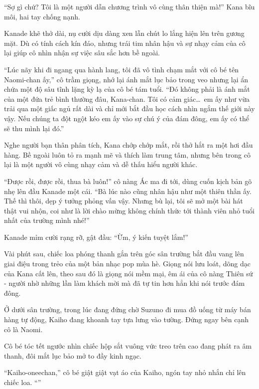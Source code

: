 \documentclass[../main.tex]{subfiles}
\begin{document}
``Sợ gì chứ? Tôi là một người dẫn chương trình vô cùng thân thiện mà!'' Kana bĩu môi, hai tay chống nạnh.

Kanade khẽ thở dài, nụ cười dịu dàng xen lẫn chút lo lắng hiện lên trên gương mặt. Dù có tính cách kín đáo, nhưng trái tim nhân hậu và sự nhạy cảm của cô lại giúp cô nhìn nhận sự việc sâu sắc hơn bề ngoài.

``Lúc nãy khi đi ngang qua hành lang, tôi đã vô tình chạm mắt với cô bé tên Naomi-chan ấy,'' cô trầm giọng, nhớ lại ánh mắt lục bảo trong veo nhưng lại ẩn chứa một độ sâu tĩnh lặng kỳ lạ của cô bé tám tuổi. ``Đó không phải là ánh mắt của một đứa trẻ bình thường đâu, Kana-chan. Tôi có cảm giác\dots\ em ấy như vừa trải qua một giấc ngủ rất dài và chỉ mới bắt đầu học cách nhìn ngắm thế giới này vậy. Nếu chúng ta đột ngột kéo em ấy vào sự chú ý của đám đông, em ấy có thể sẽ thu mình lại đó.''

Nghe người bạn thân phân tích, Kana chớp chớp mắt, rồi thở hắt ra một hơi đầu hàng. Bề ngoài luôn tỏ ra mạnh mẽ và thích làm trung tâm, nhưng bên trong cô lại là một người vô cùng nhạy cảm và dễ thấu hiểu người khác.

``Được rồi, được rồi, thua bà luôn!'' cô nàng Ác ma đi tới, dùng cuốn kịch bản gõ nhẹ lên đầu Kanade một cái. ``Bà lúc nào cũng nhân hậu như một thiên thần ấy. Thế thì thôi, dẹp ý tưởng phỏng vấn vậy. Nhưng bù lại, tôi sẽ mở một bài hát thật vui nhộn, coi như là lời chào mừng không chính thức tới thành viên nhỏ tuổi nhất của trường mình nhé!''

Kanade mỉm cười rạng rỡ, gật đầu: ``Ừm, ý kiến tuyệt lắm!''

Vài phút sau, chiếc loa phóng thanh gắn trên góc sân trường bắt đầu vang lên giai điệu trong trẻo của một bản nhạc pop mùa hè. Giọng nói lưu loát, dõng dạc của Kana cất lên, theo sau đó là giọng nói mềm mại, êm ái của cô nàng Thiên sứ - người nhờ những lần làm khách mời mà đã tự tin hơn hẳn khi nói trước đám đông.

Ở dưới sân trường, trong lúc đang đứng chờ Suzuno đi mua đồ uống từ máy bán hàng tự động, Kaiho đang khoanh tay tựa lưng vào tường. Đứng ngay bên cạnh cô là Naomi.

Cô bé tóc tết ngước nhìn chiếc hộp sắt vuông vức treo trên cao đang phát ra âm thanh, đôi mắt lục bảo mở to đầy kinh ngạc.

``Kaiho-oneechan,'' cô bé giật giật vạt áo của Kaiho, ngón tay nhỏ nhắn chỉ lên chiếc loa. ``''
\end{document}
